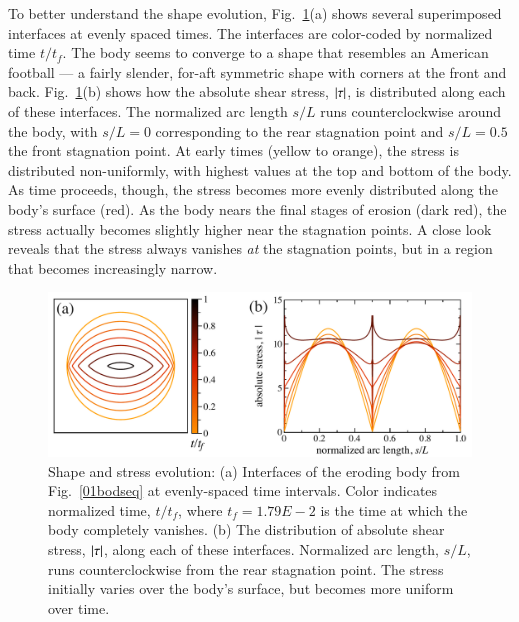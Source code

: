 \documentclass[preprint, 10pt]{elsarticle}
\begin{document}
To better understand the shape evolution, Fig.~\ref{shrink_intface}(a) shows several superimposed interfaces at evenly spaced times. The interfaces are color-coded by normalized time $t/t_f$. The body seems to converge to a shape that resembles an American football --- a fairly slender, for-aft symmetric shape with corners at the front and back.
Fig.~\ref{shrink_intface}(b) shows how the absolute shear stress, $\lvert \tau \rvert$, is distributed along each of these interfaces. The normalized arc length $s/L$ runs counterclockwise around the body, with $s/L = 0$ corresponding to the rear stagnation point and $s/L = 0.5$ the front stagnation point. At early times (yellow to orange), the stress is distributed non-uniformly, with highest values at the top and bottom of the body. As time proceeds, though, the stress becomes more evenly distributed along the body's surface (red). As the body nears the final stages of erosion (dark red), the stress actually becomes slightly higher near the stagnation points. A close look reveals that the stress always vanishes {\em at} the stagnation points, but in a region that becomes increasingly narrow.

\begin{figure}%
\begin{center}
\includegraphics[width = 0.8 \textwidth]{./figs/shrink_intface.pdf}
\caption{
Shape and stress evolution: (a) Interfaces of the eroding body from Fig.~\ref{01bodseq} at evenly-spaced time intervals. Color indicates normalized time, $t/t_f$, where $t_f = 1.79E-2$ is the time at which the body completely vanishes. (b) The distribution of absolute shear stress, $\lvert \tau \rvert$, along each of these interfaces. Normalized arc length, $s/L$, runs counterclockwise from the rear stagnation point. The stress initially varies over the body's surface, but becomes more uniform over time.}
\label{shrink_intface}
\end{center}
\end{figure}
\end{document}
